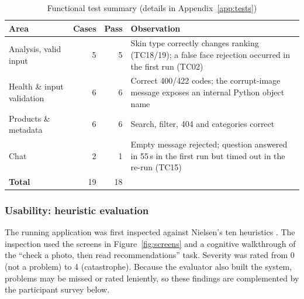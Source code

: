 \begin{table}[ht]
\centering\small
\caption{Functional test summary (details in Appendix~\ref{app:tests})}
\label{tab:funcsummary}
\begin{tabularx}{\linewidth}{lrrY}
\toprule
\textbf{Area} & \textbf{Cases} & \textbf{Pass} & \textbf{Observation}\\
\midrule
Analysis, valid input & 5 & 5 & Skin type correctly changes ranking (TC18/19); a false face rejection occurred in the first run (TC02)\\
Health \& input validation & 6 & 6 & Correct 400/422 codes; the corrupt-image message exposes an internal Python object name\\
Products \& metadata & 6 & 6 & Search, filter, 404 and categories correct\\
Chat & 2 & 1 & Empty message rejected; question answered in 55\,s in the first run but timed out in the re-run (TC15)\\
\midrule
\textbf{Total} & 19 & 18 & \\
\bottomrule
\end{tabularx}
\end{table}

\subsubsection*{Usability: heuristic evaluation}

The running application was first inspected against Nielsen's ten heuristics \citep{galavi2024}. The inspection used the screens in Figure~\ref{fig:screens} and a cognitive walkthrough of the ``check a photo, then read recommendations'' task. Severity was rated from 0 (not a problem) to 4 (catastrophe). Because the evaluator also built the system, problems may be missed or rated leniently, so these findings are complemented by the participant survey below.

